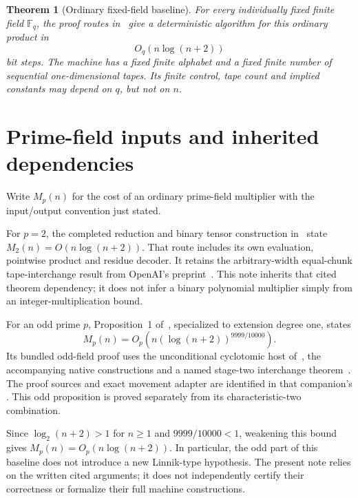 \documentclass[11pt]{article}
\newtheorem{theorem}{Theorem}
\newcommand{\F}{\mathbb F}
\begin{document}
\begin{theorem}[Ordinary fixed-field baseline]
\label{thm:baseline}
For every individually fixed finite field $\F_q$, the proof routes
in~\cite{SimpleBinary,GeneralBest} give a deterministic algorithm
for this ordinary product in
\[
 O_q\!\left(n\log(n+2)\right)
\]
bit steps. The machine has a fixed finite alphabet and a fixed finite
number of sequential one-dimensional tapes. Its finite control,
tape count and implied constants may depend on $q$, but not on $n$.
\end{theorem}

\section{Prime-field inputs and inherited dependencies}
Write $M_p(n)$ for the cost of an ordinary prime-field multiplier
with the input/output convention just stated.

For $p=2$, the completed reduction and binary tensor construction
in~\cite{SimpleBinary} state
$M_2(n)=O(n\log(n+2))$. That route includes its own evaluation,
pointwise product and residue decoder. It retains the arbitrary-width
equal-chunk tape-interchange result from OpenAI's
preprint~\cite[Lemma 12, Section 4]{OpenAI26}. This note inherits
that cited theorem dependency; it does not infer a binary polynomial
multiplier simply from an integer-multiplication bound.

For an odd prime $p$, Proposition~1 of~\cite{GeneralBest}, specialized
to extension degree one, states
\[
 M_p(n)=O_p\!\left(n(\log(n+2))^{9999/10000}\right).
\]
Its bundled odd-field proof uses the unconditional cyclotomic host
of~\cite{HVH19Cyclo}, the accompanying native constructions and a
named stage-two interchange theorem~\cite{Stage2}. The proof sources
and exact movement adapter are identified in that companion's
. This odd proposition is proved
separately from its characteristic-two combination.

Since $\log_2(n+2)>1$ for $n\ge1$ and $9999/10000<1$, weakening
this bound gives $M_p(n)=O_p(n\log(n+2))$. In particular, the odd
part of this baseline does not introduce a new Linnik-type
hypothesis. The present note relies on the written cited arguments;
it does not independently certify their correctness or formalize
their full machine constructions.
\end{document}
